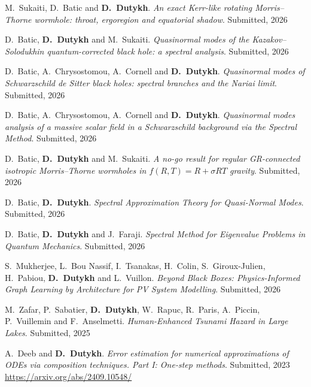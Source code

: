 \begin{etaremune}

  \item M.~Sukaiti, D.~Batic and \textbf{D.~Dutykh}. \textit{An exact Kerr-like rotating Morris--Thorne wormhole: throat, ergoregion and equatorial shadow}. Submitted, 2026 %

  \item D.~Batic, \textbf{D.~Dutykh} and M.~Sukaiti. \textit{Quasinormal modes of the Kazakov--Solodukhin quantum-corrected black hole: a spectral analysis}. Submitted, 2026 %

  \item D.~Batic, A.~Chrysostomou, A.~Cornell and \textbf{D.~Dutykh}. \textit{Quasinormal modes of Schwarzschild de Sitter black holes: spectral branches and the Nariai limit}. Submitted, 2026 %

  \item D.~Batic, A.~Chrysostomou, A.~Cornell and \textbf{D.~Dutykh}. \textit{Quasinormal modes analysis of a massive scalar field in a Schwarzschild background via the Spectral Method}. Submitted, 2026 %

  \item D.~Batic, \textbf{D.~Dutykh} and M.~Sukaiti. \textit{A no-go result for regular GR-connected isotropic Morris--Thorne wormholes in $f(R, T) = R + \sigma R T$ gravity}. Submitted, 2026 %
  
  \item D.~Batic, \textbf{D.~Dutykh}. \textit{Spectral Approximation Theory for Quasi-Normal Modes}. Submitted, 2026 %

  \item D.~Batic, \textbf{D.~Dutykh} and J.~Faraji. \textit{Spectral Method for Eigenvalue Problems in Quantum Mechanics}. Submitted, 2026 %

  \item S.~Mukherjee, L.~Bou Nassif, I.~Tsanakas, H.~Colin, S.~Giroux-Julien, H.~Pabiou, \textbf{D.~Dutykh} and L.~Vuillon. \textit{Beyond Black Boxes: Physics-Informed Graph Learning by Architecture for PV System Modelling}. Submitted, 2026 %

  \item M.~Zafar, P.~Sabatier, \textbf{D.~Dutykh}, W.~Rapuc, R.~Paris, A.~Piccin, P.~Vuillemin and F.~Anselmetti. \textit{Human-Enhanced Tsunami Hazard in Large Lakes}. Submitted, 2025 %

  \item A.~Deeb and \textbf{D.~Dutykh}. \textit{Error estimation for numerical approximations of ODEs via composition techniques. Part I: One-step methods}. Submitted, 2023 \\ %
  \url{https://arxiv.org/abs/2409.10548/}

\end{etaremune}

